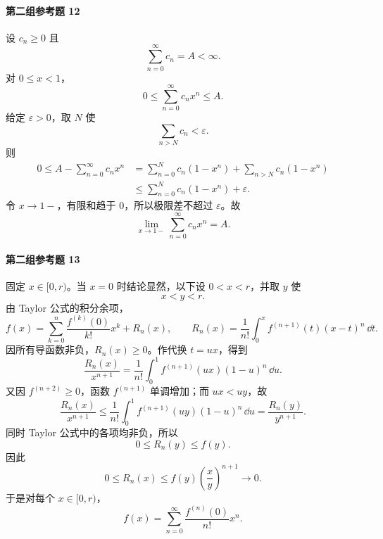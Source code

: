 \paragraph{第二组参考题 12}
\begin{xsolution}
设 $c_n\geqslant0$ 且
\[
  \sum_{n=0}^{\infty}c_n=A<\infty.
\]
对 $0\leqslant x<1$，
\[
  0\leqslant\sum_{n=0}^{\infty}c_nx^n\leqslant A.
\]
给定 $\varepsilon>0$，取 $N$ 使
\[
  \sum_{n>N}c_n<\varepsilon.
\]
则
\[
\begin{aligned}
  0\leqslant
  A-\sum_{n=0}^{\infty}c_nx^n
  &=\sum_{n=0}^{N}c_n(1-x^n)
   +\sum_{n>N}c_n(1-x^n)\\
  &\leqslant\sum_{n=0}^{N}c_n(1-x^n)+\varepsilon.
\end{aligned}
\]
令 $x\to1-$，有限和趋于 $0$，所以极限差不超过 $\varepsilon$。故
\[
  \boxed{
  \lim_{x\to1-}\sum_{n=0}^{\infty}c_nx^n=A}.
\]
\end{xsolution}

\paragraph{第二组参考题 13}
\begin{xsolution}
固定 $x\in[0,r)$。当 $x=0$ 时结论显然，以下设 $0<x<r$，并取 $y$ 使
\[
  x<y<r.
\]
由 Taylor 公式的积分余项，
\[
  f(x)=\sum_{k=0}^{n}\frac{f^{(k)}(0)}{k!}x^k+R_n(x),
  \qquad
  R_n(x)=\frac1{n!}\int_0^x f^{(n+1)}(t)(x-t)^n\,\dd t.
\]
因所有导函数非负，$R_n(x)\geqslant0$。作代换 $t=ux$，得到
\[
  \frac{R_n(x)}{x^{n+1}}
  =\frac1{n!}\int_0^1 f^{(n+1)}(ux)(1-u)^n\,\dd u.
\]
又因 $f^{(n+2)}\geqslant0$，函数 $f^{(n+1)}$ 单调增加；而 $ux<uy$，故
\[
  \frac{R_n(x)}{x^{n+1}}
  \leqslant
  \frac1{n!}\int_0^1 f^{(n+1)}(uy)(1-u)^n\,\dd u
  =\frac{R_n(y)}{y^{n+1}}.
\]
同时 Taylor 公式中的各项均非负，所以
\[
  0\leqslant R_n(y)\leqslant f(y).
\]
因此
\[
  0\leqslant R_n(x)
  \leqslant f(y)\left(\frac xy\right)^{n+1}\to0.
\]
于是对每个 $x\in[0,r)$，
\[
  \boxed{
  f(x)=\sum_{n=0}^{\infty}\frac{f^{(n)}(0)}{n!}x^n}.
\]
\end{xsolution}

